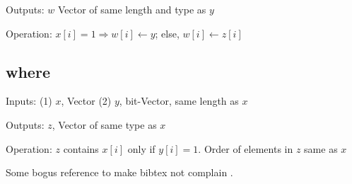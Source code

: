 \item Outputs: \(w\) Vector of same length and type as \(y\)

\item Operation: \(x[i] = 1 \Rightarrow w[i] \leftarrow y\); else, \(w[i]
\leftarrow z[i]\)

\ei


\subsection{where}
\bi
\item Inputs: (1) \(x\), Vector  (2) \(y\), bit-Vector, same length as \(x\)

\item Outputs: \(z\), Vector of same type as \(x\)

\item Operation: \(z\) contains \(x[i]\) only if
\(y[i] = 1\). Order of elements in  \(z\) same as \(x\)

\ei

\appendix
Some bogus reference to make bibtex not complain \cite{Hastie2009}.


